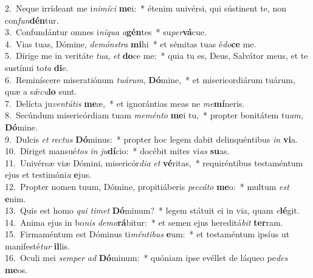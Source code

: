 {2.~}Neque irrídeant me i\textit{ni}\textit{mí}\textit{ci} \textbf{me}i:~* étenim univérsi, qui sústinent te, non con\textit{fun}\textbf{dén}tur.\\
{3.~}Confundántur omnes i\textit{ní}\textit{qua} \textit{a}\textbf{gén}tes~* su\textit{per}\textbf{vá}cue.\\
{4.~}Vias tuas, Dómine, \textit{de}\textit{món}\textit{stra} \textbf{mi}hi~* et sémitas tuas é\textit{do}\textbf{ce} me.\\
{5.~}Dírige me in veritáte \textit{tu}\textit{a}, \textit{et} \textbf{do}ce me:~* quia tu es, Deus, Salvátor meus, et te sustínui to\textit{ta} \textbf{di}e.\\
{6.~}Reminíscere miseratiónum \textit{tu}\textit{á}\textit{rum}, \textbf{Dó}mine,~* et misericordiárum tuárum, quæ a sǽ\textit{cu}\textbf{lo} sunt.\\
{7.~}Delícta ju\textit{ven}\textit{tú}\textit{tis} \textbf{me}æ,~* et ignorántias meas ne \textit{me}\textbf{mí}neris.\\
{8.~}Secúndum misericórdiam tuam \textit{me}\textit{mén}\textit{to} \textbf{me}i tu,~* propter bonitátem tu\textit{am}, \textbf{Dó}mine.\\
{9.~}Dulcis \textit{et} \textit{re}\textit{ctus} \textbf{Dó}minus:~* propter hoc legem dabit delinquéntibus \textit{in} \textbf{vi}a.\\
{10.~}Díriget mansué\textit{tos} \textit{in} \textit{ju}\textbf{dí}cio:~* docébit mites vi\textit{as} \textbf{su}as.\\
{11.~}Univérsæ viæ Dómini, misericór\textit{di}\textit{a} \textit{et} \textbf{vé}ritas,~* requiréntibus testaméntum ejus et testimóni\textit{a} \textbf{e}jus.\\
{12.~}Propter nomen tuum, Dómine, propitiáberis \textit{pec}\textit{cá}\textit{to} \textbf{me}o:~* multum \textit{est} \textbf{e}nim.\\
{13.~}Quis est homo \textit{qui} \textit{ti}\textit{met} \textbf{Dó}minum?~* legem státuit ei in via, quam \textit{e}\textbf{lé}git.\\
{14.~}Anima ejus in bo\textit{nis} \textit{de}\textit{mo}\textbf{rá}bitur:~* et semen ejus hereditá\textit{bit} \textbf{ter}ram.\\
{15.~}Firmaméntum est Dóminus ti\textit{mén}\textit{ti}\textit{bus} \textbf{e}um:~* et testaméntum ipsíus ut manifesté\textit{tur} \textbf{il}lis.\\
{16.~}Oculi mei \textit{sem}\textit{per} \textit{ad} \textbf{Dó}minum:~* quóniam ipse evéllet de láqueo pe\textit{des} \textbf{me}os.\\
